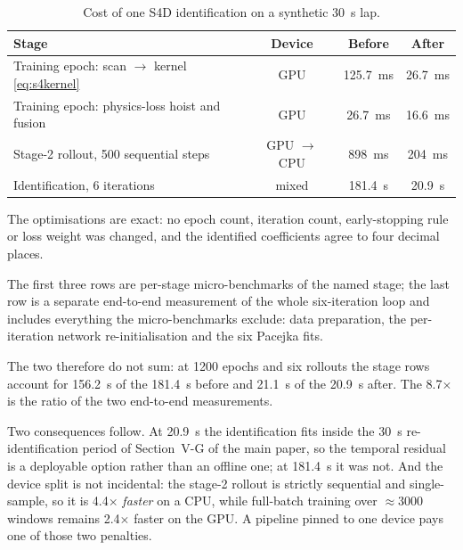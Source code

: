 \begin{table}[t]
\caption{Cost of one S4D identification on a synthetic \SI{30}{\second} lap.}
\label{sup:tabruntime}
\centering
\begin{threeparttable}
\scriptsize
\begin{tabular}{@{}p{3.1cm}ccc@{}}
\toprule
Stage & Device & Before & After\\
\midrule
Training epoch: scan $\to$ kernel \eqref{eq:s4kernel} & GPU &
\SI{125.7}{\milli\second} & \SI{26.7}{\milli\second}\\
Training epoch: physics-loss hoist and fusion & GPU &
\SI{26.7}{\milli\second} & \SI{16.6}{\milli\second}\\
Stage-2 rollout, 500 sequential steps & GPU $\to$ CPU &
\SI{898}{\milli\second} & \SI{204}{\milli\second}\\
\addlinespace
Identification, 6 iterations & mixed & \SI{181.4}{\second} &
\SI{20.9}{\second}\\
\bottomrule
\end{tabular}
\begin{tablenotes}[flushleft]\scriptsize
\item The optimisations are exact: no epoch count, iteration count, early-stopping rule or loss weight was changed, and the identified coefficients agree to four decimal places.
\item The first three rows are per-stage micro-benchmarks of the named stage;
the last row is a separate end-to-end measurement of the whole six-iteration
loop and includes everything the micro-benchmarks exclude: data preparation,
the per-iteration network re-initialisation and the six Pacejka fits.
\item The two therefore do not sum: at \num{1200} epochs and six rollouts the stage rows account for \SI{156.2}{\second} of the \SI{181.4}{\second} before and \SI{21.1}{\second} of the \SI{20.9}{\second} after. The \num{8.7}$\times$ is the ratio of the two end-to-end measurements.
\end{tablenotes}
\end{threeparttable}
\end{table}

Two consequences follow. At \SI{20.9}{\second} the identification fits inside
the \SI{30}{\second} re-identification period of
Section~V-G of the main paper, so the temporal residual is a deployable
option rather than an offline one; at \SI{181.4}{\second} it was not. And the
device split is not incidental: the stage-2 rollout is strictly sequential and
single-sample, so it is \num{4.4}$\times$ \emph{faster} on a CPU, while
full-batch training over $\approx\num{3000}$ windows remains
\num{2.4}$\times$ faster on the GPU. A pipeline pinned to one device pays one
of those two penalties.

